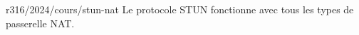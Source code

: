 \begin{question}{r316/2024/cours/stun-nat}
  Le protocole STUN fonctionne avec tous les types de passerelle NAT.
  \begin{reponses}
  \end{reponses}
\end{question}
